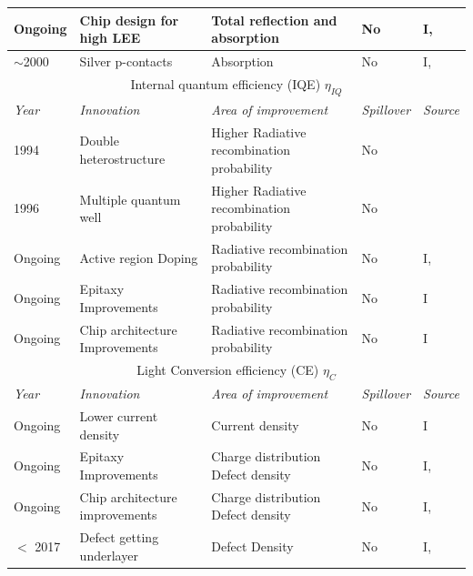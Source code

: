 \documentclass[10pt]{article}
\begin{document}
\begin{table}[H]
\begin{tabularx}{\textwidth}{ |l|X|X|l|l| }
        \hline
            Ongoing & Chip design for high LEE & Total reflection and absorption & No & I, \cite{Haerle2004} \\
        \hline
            $\sim$2000 & Silver p-contacts & Absorption & No & I, \cite{kondoh2001nitride} \\
        \hline
        \multicolumn{5}{c}{Internal quantum efficiency (IQE) $\eta_{IQ}$} \\
        \hline
            \textit{Year} & \textit{Innovation} & \textit{Area of improvement} & \textit{Spillover} & \textit{Source} \\
        \hline
            1994 & Double heterostructure & Higher Radiative recombination probability & No & \cite{Nakamura1994} \\
        \hline
            1996 & Multiple quantum well & Higher Radiative recombination probability & No & \cite{Koike1996} \\
        \hline
            Ongoing & Active region \newline Doping & Radiative recombination probability & No & I, \cite{schubert2018light} \\
        \hline
            Ongoing & Epitaxy \newline Improvements & Radiative recombination probability & No & I \\
        \hline
            Ongoing & Chip architecture \newline Improvements & Radiative recombination probability & No & I \\
        \hline
        \multicolumn{5}{c}{Light Conversion efficiency (CE) $\eta_{C}$} \\
        \hline
            \textit{Year} & \textit{Innovation} & \textit{Area of improvement} & \textit{Spillover} & \textit{Source} \\
        \hline
            Ongoing & Lower current density & Current density & No & I \\
        \hline
            Ongoing & Epitaxy \newline Improvements & Charge distribution \newline Defect density & No & I, \cite{bhardwaj2016progress} \\
        \hline
            Ongoing & Chip architecture \newline improvements  & Charge distribution \newline Defect density & No & I, \cite{Wildeson2017} \\
        \hline
            $<$ 2017 & Defect getting \newline underlayer & Defect Density & No & I, \cite{haller2017burying} \\
        \hline
        \end{tabularx}
    \vspace{5mm}
    

\end{table}
\end{document}
